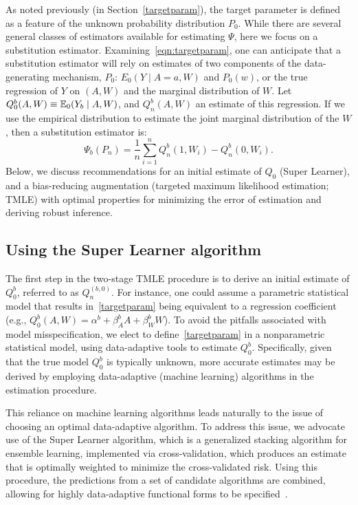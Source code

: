 As noted previously (in Section~\ref{targetparam}), the target parameter is
defined as a feature of the unknown probability distribution $P_{0}$. While
there are several general classes of estimators available for estimating
$\Psi$, here we focus on a substitution estimator.
Examining~\ref{eqn:targetparam}, one can anticipate that a substitution
estimator will rely on estimates of two components of the data-generating
mechanism, $P_0$: $E_0 (Y \mid A = a, W)$ and $P_0(w)$, or the true regression
of $Y$ on $(A, W)$ and the marginal distribution of $W$. Let
$Q^{b}_{0}(A, W) \equiv \mathbb{E}_{0}(Y_{b} \mid A, W)$, and $Q^{b}_{n}(A,W)$ an
estimate of this regression. If we use the empirical distribution to estimate
the joint marginal distribution of the $W$, then a substitution estimator is:
\begin{equation}
\label{subest}
\Psi_b(P_{n}) = \frac{1}{n}\sum_{i = 1}^{n} Q^{b}_{n}(1, W_{i}) - Q^{b}_{n}(0, W_{i}).
\end{equation}
Below, we discuss recommendations for an initial estimate of $Q_0$ (Super
Learner), and a bias-reducing augmentation (targeted maximum likelihood
estimation; TMLE) with optimal properties for minimizing the error of
estimation and deriving robust inference.

\subsection{Using the Super Learner algorithm}\label{superlearner}

The first step in the two-stage TMLE procedure is to derive an initial estimate
of $Q^{b}_{0}$, referred to as $Q^{(b, 0)}_{n}$. For instance, one could assume
a parametric statistical model that results in~\ref{targetparam} being
equivalent to a regression coefficient (e.g., $Q^{b}_{0}(A, W) = \alpha^{b} +
\beta^{b}_{A}A + \beta^{b}_{W}W$). To avoid the pitfalls associated with model
misspecification, we elect to define~\ref{targetparam} in a nonparametric
statistical model, using data-adaptive tools to estimate $Q^{b}_{0}$.
Specifically, given that the true model $Q^{b}_{0}$ is typically unknown, more
accurate estimates may be derived by employing data-adaptive (machine learning)
algorithms in the estimation procedure.

This reliance on machine learning algorithms leads naturally to the issue of
choosing an optimal data-adaptive algorithm. To address this issue, we advocate
use of the Super Learner algorithm, which is a generalized stacking algorithm
for ensemble learning, implemented via cross-validation, which produces an
estimate that is optimally weighted to minimize the cross-validated risk. Using
this procedure, the predictions from a set of candidate algorithms are
combined, allowing for highly data-adaptive functional forms to be
specified~\cite{van2007super}.

